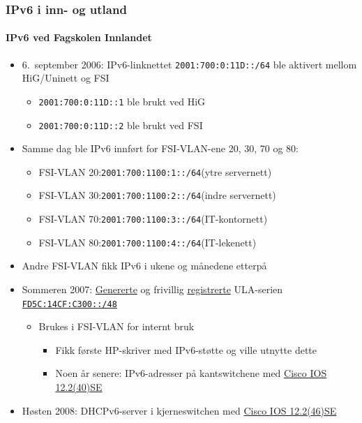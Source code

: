 \begin{frame}
  \frametitle{IPv6 i inn- og utland}
  \framesubtitle{IPv6 ved Fagskolen Innlandet}
  \begin{itemize}
  \item 6.~september 2006: IPv6-linknettet
    \texttt{2001:700:0:11D::/64} ble aktivert mellom HiG/Uninett og
    FSI
    \begin{itemize}
    \item \texttt{2001:700:0:11D::1} ble brukt ved HiG
    \item \texttt{2001:700:0:11D::2} ble brukt ved FSI
    \end{itemize}
  \item Samme dag ble IPv6 innført for FSI-VLAN-ene 20, 30, 70 og 80:
    \begin{itemize}
    \item FSI-VLAN 20:\quad\texttt{2001:700:1100:1::/64}\hfill(ytre servernett)
    \item FSI-VLAN 30:\quad\texttt{2001:700:1100:2::/64}\hfill(indre servernett)
    \item FSI-VLAN 70:\quad\texttt{2001:700:1100:3::/64}\hfill(IT-kontornett)
    \item FSI-VLAN 80:\quad\texttt{2001:700:1100:4::/64}\hfill(IT-lekenett)
    \end{itemize}
  \item Andre FSI-VLAN fikk IPv6 i ukene og månedene etterpå
  \item Sommeren 2007:
    \href{http://www.sixxs.net/tools/grh/ula/}{Genererte} og frivillig
    \href{http://www.sixxs.net/tools/grh/ula/list/}{registrerte}
    ULA-serien
    \href{http://www.sixxs.net/tools/whois/?fd5c:14cf:c300::/48}{\texttt{FD5C:14CF:C300::/48}}
    \begin{itemize}
    \item Brukes i FSI-VLAN for internt bruk
      \begin{itemize}
      \item Fikk første HP-skriver med IPv6-støtte og ville utnytte dette
      \item Noen år senere: IPv6-adresser på kantswitchene med
        \href{http://www.cisco.com/en/US/docs/switches/lan/catalyst3750/software/release/12.2_40_se/release/notes/OL13860.html}{Cisco
          IOS 12.2(40)SE}
      \end{itemize}
    \end{itemize}
  \item Høsten 2008: DHCPv6-server i kjerneswitchen med
    \href{https://www.cisco.com/c/en/us/td/docs/switches/lan/catalyst3750/software/release/12-2_44_se/release/notes/OL14630.html}{Cisco
      IOS 12.2(46)SE}
  \end{itemize}
\end{frame}


